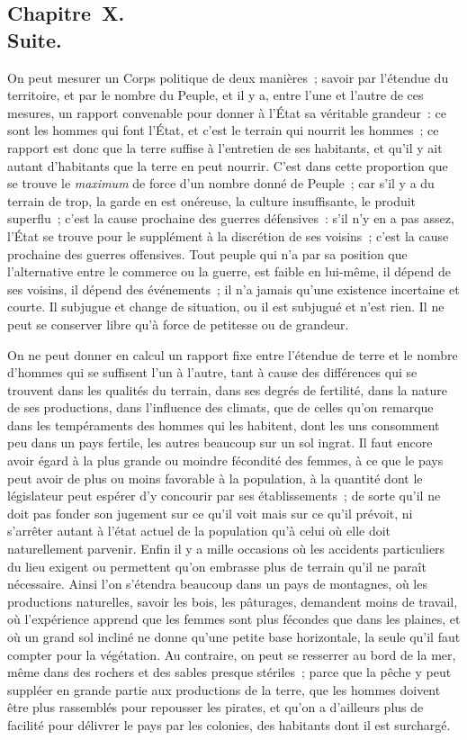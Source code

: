 \documentclass[french,twoside]{book} %
\begin{document}
\subsection[{Chapitre X. Suite.}]{Chapitre X. \\
Suite.}
\noindent On peut mesurer un Corps politique de deux manières ; savoir par l’étendue du territoire, et par le nombre du Peuple, et il y a, entre l’une et l’autre de ces mesures, un rapport convenable pour donner à l’État sa véritable grandeur : ce sont les hommes qui font l’État, et c’est le terrain qui nourrit les hommes ; ce rapport est donc que la terre suffise à l’entretien de ses habitants, et qu’il y ait autant d’habitants que la terre en peut nourrir. C’est dans cette proportion que se trouve le {\itshape maximum} de force d’un nombre donné de Peuple ; car s’il y a du terrain de trop, la garde en est onéreuse, la culture insuffisante, le produit superflu ; c’est la cause prochaine des guerres défensives : s’il n’y en a pas assez, l’État se trouve pour le supplément à la discrétion de ses voisins ; c’est la cause prochaine des guerres offensives. Tout peuple qui n’a par sa position que l’alternative entre le commerce ou la guerre, est faible en lui-même, il dépend de ses voisins, il dépend des événements ; il n’a jamais qu’une existence incertaine et courte. Il subjugue et change de situation, ou il est subjugué et n’est rien. Il ne peut se conserver libre qu’à force de petitesse ou de grandeur.\par
On ne peut donner en calcul un rapport fixe entre l’étendue de terre et le nombre d’hommes qui se suffisent l’un à l’autre, tant à cause des différences qui se trouvent dans les qualités du terrain, dans ses degrés de fertilité, dans la nature de ses productions, dans l’influence des climats, que de celles qu’on remarque dans les tempéraments des hommes qui les habitent, dont les uns consomment peu dans un pays fertile, les autres beaucoup sur un sol ingrat. Il faut encore avoir égard à la plus grande ou moindre fécondité des femmes, à ce que le pays peut avoir de plus ou moins favorable à la population, à la quantité dont le législateur peut espérer d’y concourir par ses établissements ; de sorte qu’il ne doit pas fonder son jugement sur ce qu’il voit mais sur ce qu’il prévoit, ni s’arrêter autant à l’état actuel de la population qu’à celui où elle doit naturellement parvenir. Enfin il y a mille occasions où les accidents particuliers du lieu exigent ou permettent qu’on embrasse plus de terrain qu’il ne paraît nécessaire. Ainsi l’on s’étendra beaucoup dans un pays de montagnes, où les productions naturelles, savoir les bois, les pâturages, demandent moins de travail, où l’expérience apprend que les femmes sont plus fécondes que dans les plaines, et où un grand sol incliné ne donne qu’une petite base horizontale, la seule qu’il faut compter pour la végétation. Au contraire, on peut se resserrer au bord de la mer, même dans des rochers et des sables presque stériles ; parce que la pêche y peut suppléer en grande partie aux productions de la terre, que les hommes doivent être plus rassemblés pour repousser les pirates, et qu’on a d’ailleurs plus de facilité pour délivrer le pays par les colonies, des habitants dont il est surchargé.\par
\end{document}
